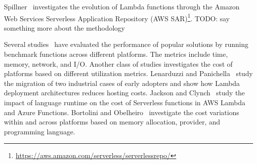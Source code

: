 Spillner~\cite{spillner2019quantitative} investigates the 
evolution of Lambda functions through the Amazon Web Services 
Serverless Application Repository
(AWS SAR)\footnote{\url{https://aws.amazon.com/serverless/serverlessrepo/}}. 
TODO: say something more about the methodology


Several studies~\cite{wang2018peeking,lloyd2018serverless,figiela2018performance,lee2018evaluation,mcgrath2017serverless,back2018using,mohanty2018evaluation} 
have evaluated the performance of popular \faas solutions by running 
benchmark functions across different platforms. The metrics include time, 
memory, network, and I/O. Another class of studies investigates the cost of \faas platforms 
based on different utilization metrics. Lenarduzzi and Panichella~\cite{adzic2017serverless} 
study the migration of two industrial cases of early adopters
and show how Lambda deployment architectures reduces hosting costs. 
Jackson and Clynch~\cite{jackson2018investigation} study the impact of 
language runtime on the cost of Serverless functions in AWS Lambda and 
Azure Functions. Bortolini and Obelheiro~\cite{bortolini2019investigating} 
investigate the cost variations within and across \faas platforms 
based on memory allocation, \faas provider, and 
programming language. 



